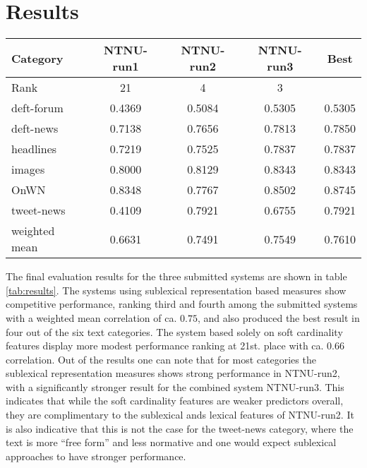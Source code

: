
\section{Results}
\label{sec:results}

\begin{table*}
  \centering
  \begin{tabular}{|l|c|c|c|c|}
    \hline
    Category & NTNU-run1 & NTNU-run2 & NTNU-run3 & Best \\
    \hline
    Rank & 21 & 4 & 3 & \\
    \hline
    deft-forum & 0.4369 & 0.5084 & 0.5305 & 0.5305 \\
    deft-news & 0.7138 & 0.7656 & 0.7813 & 0.7850 \\
    headlines & 0.7219 & 0.7525 & 0.7837 & 0.7837 \\
    images & 0.8000 & 0.8129 & 0.8343 & 0.8343 \\
    OnWN & 0.8348 & 0.7767 & 0.8502 & 0.8745 \\
    tweet-news & 0.4109 & 0.7921 & 0.6755	& 0.7921 \\
    \hline
    weighted mean & 0.6631 & 0.7491 & 0.7549 & 0.7610 \\
    \hline
  \end{tabular}
  \caption{Final evaluation results for the submitted systems.}
  \label{tab:results}
\end{table*}

The final evaluation results for the three submitted systems are shown in table \ref{tab:results}. The systems using sublexical representation based measures show competitive performance, ranking third and fourth among the submitted systems with a weighted mean correlation of ca. $0.75$, and also produced the best result in four out of the six text categories. The system based solely on soft cardinality features display more modest performance ranking at 21st. place with ca. 0.66 correlation. Out of the results one can note that for most categories the sublexical representation measures shows strong performance in NTNU-run2, with a significantly stronger result for the combined system NTNU-run3. This indicates that while the soft cardinality features are weaker predictors overall, they are complimentary to the sublexical ands lexical features of NTNU-run2. It is also indicative that this is not the case for the tweet-news category, where the text is more ``free form'' and less normative and one would expect sublexical approaches to have stronger performance.

